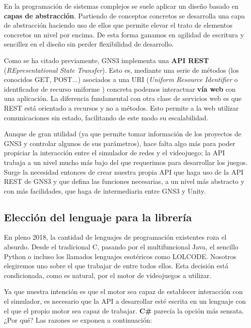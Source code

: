 En la programación de sistemas complejos se suele aplicar un diseño basado en \textbf{capas de abstracción}. Partiendo de conceptos concretos se desarrolla una capa de abstracción haciendo uso de ellos que permite elevar el trato de elementos concretos un nivel por encima\cite{abstraction}. De esta forma ganamos en agilidad de escritura y sencillez en el diseño sin perder flexibilidad de desarrollo.

Como se ha citado previamente, GNS3 implementa una \textbf{API REST} (\textit{REpresentational State Transfer}). Esto es, mediante una serie de métodos (los conocidos GET, POST...) asociados a una URI (\textit{Uniform Resource Identifier} o identficador de recurso uniforme \cite{uri}) concreta podemos interactuar \textbf{vía web} con una aplicación. La diferencia fundamental con otra clase de servicios web es que REST está orientado a recursos y no a métodos. Esto permite a la web utilizar comunicaciones sin estado, facilitando de este modo su escalabilidad\cite{REST}.

Aunque de gran utilidad (ya que permite tomar información de los proyectos de GNS3 y controlar algunos de sus parámetros), hace falta algo más para poder propiciar la interacción entre el simulador de redes y el videojuego; la API trabaja a un nivel mucho más bajo del que requerimos para desarrollar los juegos. Surge la necesidad entonces de crear nuestra propia API que haga uso de la API REST de GNS3 y que defina las funciones necesarias, a un nivel más abstracto y con más facilidades, que haga de intermediaria entre GNS3 y Unity.

\subsection{Elección del lenguaje para la librería}
En pleno 2018, la cantidad de lenguajes de programación existentes roza el absurdo. Desde el tradicional C, pasando por el multifuncional Java, el sencillo Python o incluso los llamados lenguajes esotéricos como LOLCODE\cite{esotericlang}. Nosotros elegiremos uno sobre el que trabajar de entre todos ellos. Esta decisión está condicionada, como es natural, por el motor de videojuegos a utilizar.

Ya que nuestra intención es que el motor sea capaz de establecer interacción con el simulador, es necesario que la API a desarrollar esté escrita en un lenguaje con el que el propio motor sea capaz de trabajar. \textbf{C\#} parecía la opción más sensata. ¿Por qué? Las razones se exponen a continuación:

